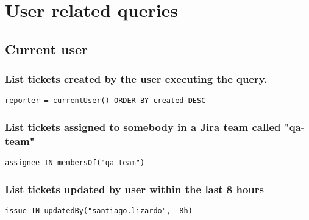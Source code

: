 \newpage
\section{User related queries}

\subsection{Current user}

\subsubsection*{List tickets created by the user executing the query.}

\begin{small}
    \begin{lstlisting}[language=jql]
reporter = currentUser() ORDER BY created DESC
\end{lstlisting}
\end{small}

\subsubsection*{List tickets assigned to somebody in a Jira team called "qa-team"}

\begin{small}
    \begin{lstlisting}[language=jql]
assignee IN membersOf("qa-team")
\end{lstlisting}
\end{small}

\subsubsection*{List tickets updated by user within the last 8 hours}

\begin{small}
    \begin{lstlisting}[language=jql]
issue IN updatedBy("santiago.lizardo", -8h)
\end{lstlisting}
\end{small}

